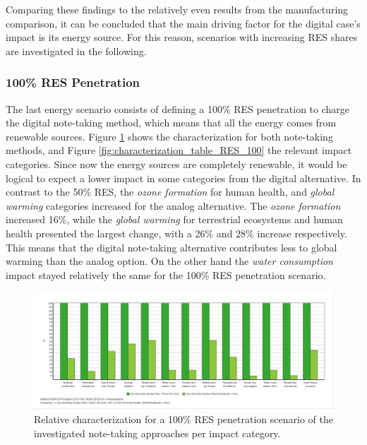 Comparing these findings to the relatively even results from the manufacturing comparison, it can be concluded that the main driving factor for the digital case's impact is its energy source. For this reason, scenarios with increasing RES shares are investigated in the following.

\subsubsection{100\% RES Penetration}

The last energy scenario consists of defining a 100\% RES penetration to charge the digital note-taking method, which means that all the energy comes from renewable sources. Figure \ref{fig:characterization_RES_100} shows the characterization for both note-taking methods, and Figure \ref{fig:characterization_table_RES_100} the relevant impact categories. Since now the energy sources are completely renewable, it would be logical to expect a lower impact in some categories from the digital alternative. In contrast to the 50\% RES, the \textit{ozone formation} for human health, and \textit{global warming} categories increased for the analog alternative. The \textit{ozone formation} increased 16\%, while the \textit{global warming} for terrestrial ecosystems and human health presented the largest change, with a 26\% and 28\% increase respectively. This means that the digital note-taking alternative contributes less to global warming than the analog option. On the other hand the \textit{water consumption} impact stayed relatively the same for the 100\% RES penetration scenario.

\begin{figure}[H]
    \centering
    \includegraphics[width=\textwidth]{images/RES_100/Characterization_RES_100.JPG}
    \caption{Relative characterization for a 100\% RES penetration scenario of the investigated note-taking approaches per impact category.}\label{fig:characterization_RES_100}
\end{figure}

